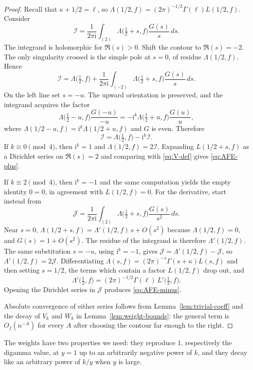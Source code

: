 \documentclass[11pt]{amsart}
\theoremstyle{definition}
\theoremstyle{remark}
\numberwithin{equation}{section}
\newcommand{\ii}{\mathrm{i}}
\begin{document}
\begin{proof}
Recall that $\kappa+1/2=\ell$, so $\Lambda(1/2,f)=(2\pi)^{-1/2}\Gamma(\ell)L(1/2,f)$. Consider
\[
\mathcal I
=\frac{1}{2\pi\ii}\int_{(2)}\Lambda\bigl(\tfrac12+s,f\bigr)\frac{G(s)}{s}\,ds.
\]
The integrand is holomorphic for $\Re(s)>0$. Shift the contour to $\Re(s)=-2$. The only singularity crossed is the simple pole at $s=0$, of residue $\Lambda(1/2,f)$. Hence
\[
\mathcal I=\Lambda\bigl(\tfrac12,f\bigr)+\frac{1}{2\pi\ii}\int_{(-2)}\Lambda\bigl(\tfrac12+s,f\bigr)\frac{G(s)}{s}\,ds.
\]
On the left line set $s=-u$. The upward orientation is preserved, and the integrand acquires the factor
\[
\Lambda\bigl(\tfrac12-u,f\bigr)\frac{G(-u)}{-u}
=-\ii^k\Lambda\bigl(\tfrac12+u,f\bigr)\frac{G(u)}{u},
\]
where $\Lambda(1/2-u,f)=\ii^k\Lambda(1/2+u,f)$ and $G$ is even. Therefore
\[
\mathcal I=\Lambda\bigl(\tfrac12,f\bigr)-\ii^k\mathcal I.
\]
If $k\equiv 0\pmod 4$, then $\ii^k=1$ and $\Lambda(1/2,f)=2\mathcal I$. Expanding $L(1/2+s,f)$ as a Dirichlet series on $\Re(s)=2$ and comparing with \eqref{eq:V-def} gives \eqref{eq:AFE-plus}.

If $k\equiv 2\pmod 4$, then $\ii^k=-1$ and the same computation yields the empty identity $0=0$, in agreement with $L(1/2,f)=0$. For the derivative, start instead from
\[
\mathcal J
=\frac{1}{2\pi\ii}\int_{(2)}\Lambda\bigl(\tfrac12+s,f\bigr)\frac{G(s)}{s^2}\,ds.
\]
Near $s=0$, $\Lambda(1/2+s,f)=\Lambda'(1/2,f)\,s+O(s^2)$ because $\Lambda(1/2,f)=0$, and $G(s)=1+O(s^2)$. The residue of the integrand is therefore $\Lambda'(1/2,f)$. The same substitution $s=-u$, using $\ii^k=-1$, gives $\mathcal J=\Lambda'(1/2,f)-\mathcal J$, so $\Lambda'(1/2,f)=2\mathcal J$. Differentiating $\Lambda(s,f)=(2\pi)^{-s}\Gamma(s+\kappa)L(s,f)$ and then setting $s=1/2$, the terms which contain a factor $L(1/2,f)$ drop out, and
\[
\Lambda'\bigl(\tfrac12,f\bigr)
=(2\pi)^{-1/2}\Gamma(\ell)\,L'\bigl(\tfrac12,f\bigr).
\]
Opening the Dirichlet series in $\mathcal J$ produces \eqref{eq:AFE-minus}.

Absolute convergence of either series follows from Lemma~\ref{lem:trivial-coeff} and the decay of $V_k$ and $W_k$ in Lemma~\ref{lem:weight-bounds}: the general term is $O_f(n^{-A})$ for every $A$ after choosing the contour far enough to the right.
\end{proof}

The weights have two properties we need: they reproduce $1$, respectively the digamma value, at $y=1$ up to an arbitrarily negative power of $k$, and they decay like an arbitrary power of $k/y$ when $y$ is large.
\end{document}
